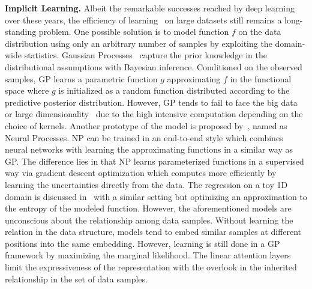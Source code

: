 \documentclass[sigconf]{acmart} %
\begin{document}
\textbf{Implicit Learning.}
Albeit the remarkable successes reached by deep learning over these years, the efficiency of learning~\cite{lake2015human,santoro2016one} on large datasets still remains a long-standing problem. One possible solution is to model function $f$ on the data distribution using only an arbitrary number of samples by exploiting the domain-wide statistics. Gaussian Processes~\cite{williams1996gaussian} capture the prior knowledge in the distributional assumptions with 
Bayesian inference. Conditioned on the observed samples, GP learns a parametric function $g$ approximating $f$ in the functional space where $g$ is initialized as a random function distributed according to the predictive posterior distribution. However, GP tends to fail to face the big data or large dimensionality~\cite{csato2002sparse,snelson2006sparse} due to the high intensive computation depending on the choice of kernels. 
Another prototype of the model is proposed by~\cite{garnelo2018neural}, named as Neural Processes. 
NP can be trained in an end-to-end style which combines neural networks with learning the approximating functions in a similar way as GP. 
The difference lies in that NP learns parameterized functions in a supervised way via gradient descent optimization which computes more efficiently by learning the uncertainties directly from the data. 
The regression on a toy 1D domain is discussed in~\cite{bachman2018vfunc} with a similar setting but optimizing an approximation to the entropy of the modeled function.
However, the aforementioned models are unconscious about the relationship among data samples. Without learning the relation in the data structure,  models tend to embed similar samples at different positions into the same embedding.
However, learning is still done in a GP framework by maximizing the marginal likelihood. The linear attention layers limit the expressiveness of the representation with the overlook in the inherited relationship in the set of data samples.
\end{document}
